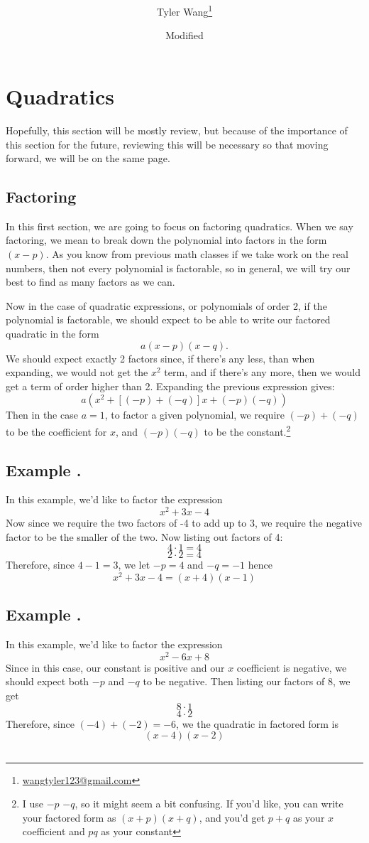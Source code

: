 \documentclass[11pt]{article}
\title{\mytitle \\ [2ex] \Large \mysubtitle}
\date{\small Modified \mydate}
\author {Tyler Wang\thanks{
\href{mailto:wangtyler123@gmail.com}{wangtyler123@gmail.com}}}
\numberwithin{lemma}{section}
\numberwithin{equation}{section}
\numberwithin{define}{section}
\numberwithin{prop}{section}
\numberwithin{figure}{section}
\numberwithin{theorem}{section}
\newcounter{ex}[section]
\newenvironment{ex}[0]{

	\refstepcounter{ex}
    \subsection*{Example \theex .}
    }
    {
    \subsection*{}
    }
\numberwithin{ex}{section}
\begin{document}
\maketitle
\section{Quadratics}
Hopefully, this section will be mostly review, but because of the importance of this section for the future, reviewing this will be necessary so that moving forward, we will be on the same page. 
\subsection{Factoring}
In this first section, we are going to focus on factoring quadratics.
When we say factoring, we mean to break down the polynomial into factors in the form $(x-p)$.
As you know from previous math classes if we take work on the real numbers, then not every polynomial is factorable, so in general, we will try our best to find as many factors as we can.

Now in the case of quadratic expressions, or polynomials of order 2, if the polynomial is factorable, we should expect to be able to write our factored quadratic in the form
$$a(x-p)(x-q).$$
We should expect exactly 2 factors since, if there's any less, than when expanding, we would not get the $x^2$ term, and if there's any more, then we would get a term of order higher than 2. 
Expanding the previous expression gives:
$$a(x^2+[(-p)+(-q)]x+(-p)(-q))$$
Then in the case $a=1$, to factor a given polynomial, we require $(-p)+(-q)$ to be the coefficient for $x$, and $(-p)(-q)$ to be the constant.\footnote{
I use $-p$ $-q$, so it might seem a bit confusing. If you'd like, you can write your factored form as $(x+p)(x+q)$, and you'd get $p+q$ as your $x$ coefficient and $pq$ as your constant}

\begin{ex}
In this example, we'd like to factor the expression
$$x^2+3x-4$$
Now since we require the two factors of -4 to add up to 3, we require the negative factor to be the smaller of the two. Now listing out factors of 4:
$$4\cdot 1 =4$$
$$2\cdot 2=4$$
Therefore, since $4-1=3$, we let $-p=4$ and $-q=-1$ hence
$$x^2+3x-4=(x+4)(x-1)$$
\end{ex}
\begin{ex}
In this example, we'd like to factor the expression
$$x^2-6x+8$$
Since in this case, our constant is positive and our $x$ coefficient is negative, we should expect both $-p$ and $-q$ to be negative. Then listing our factors of $8$, we get
$$8\cdot 1$$
$$4\cdot 2$$
Therefore, since $(-4)+(-2)=-6$, we the quadratic in factored form is
$$(x-4)(x-2)$$
\end{ex}
\end{document}
